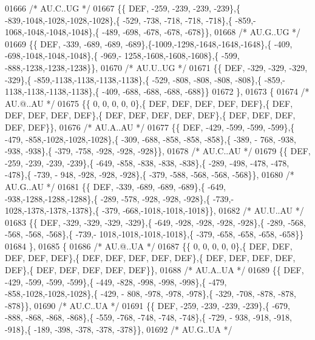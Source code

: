 \begin{DoxyCode}
01666 \textcolor{comment}{/* AU.C..UG */}
01667 \{\{  DEF, -259, -239, -239, -239\},\{ -839,-1048,-1028,-1028,-1028\},\{ -529, -738, -718, -718, -718\},\{ -859,-
      1068,-1048,-1048,-1048\},\{ -489, -698, -678, -678, -678\}\},
01668 \textcolor{comment}{/* AU.G..UG */}
01669 \{\{  DEF, -339, -689, -689, -689\},\{-1009,-1298,-1648,-1648,-1648\},\{ -409, -698,-1048,-1048,-1048\},\{ -969,-
      1258,-1608,-1608,-1608\},\{ -599, -888,-1238,-1238,-1238\}\},
01670 \textcolor{comment}{/* AU.U..UG */}
01671 \{\{  DEF, -329, -329, -329, -329\},\{ -859,-1138,-1138,-1138,-1138\},\{ -529, -808, -808, -808, -808\},\{ -859,-
      1138,-1138,-1138,-1138\},\{ -409, -688, -688, -688, -688\}\}
01672 \},
01673 \{
01674 \textcolor{comment}{/* AU.@..AU */}
01675 \{\{    0,    0,    0,    0,    0\},\{  DEF,  DEF,  DEF,  DEF,  DEF\},\{  DEF,  DEF,  DEF,  DEF,  DEF\},\{  DEF,  
      DEF,  DEF,  DEF,  DEF\},\{  DEF,  DEF,  DEF,  DEF,  DEF\}\},
01676 \textcolor{comment}{/* AU.A..AU */}
01677 \{\{  DEF, -429, -599, -599, -599\},\{ -479, -858,-1028,-1028,-1028\},\{ -309, -688, -858, -858, -858\},\{ -389, -
      768, -938, -938, -938\},\{ -379, -758, -928, -928, -928\}\},
01678 \textcolor{comment}{/* AU.C..AU */}
01679 \{\{  DEF, -259, -239, -239, -239\},\{ -649, -858, -838, -838, -838\},\{ -289, -498, -478, -478, -478\},\{ -739, -
      948, -928, -928, -928\},\{ -379, -588, -568, -568, -568\}\},
01680 \textcolor{comment}{/* AU.G..AU */}
01681 \{\{  DEF, -339, -689, -689, -689\},\{ -649, -938,-1288,-1288,-1288\},\{ -289, -578, -928, -928, -928\},\{ -739,-
      1028,-1378,-1378,-1378\},\{ -379, -668,-1018,-1018,-1018\}\},
01682 \textcolor{comment}{/* AU.U..AU */}
01683 \{\{  DEF, -329, -329, -329, -329\},\{ -649, -928, -928, -928, -928\},\{ -289, -568, -568, -568, -568\},\{ -739,-
      1018,-1018,-1018,-1018\},\{ -379, -658, -658, -658, -658\}\}
01684 \},
01685 \{
01686 \textcolor{comment}{/* AU.@..UA */}
01687 \{\{    0,    0,    0,    0,    0\},\{  DEF,  DEF,  DEF,  DEF,  DEF\},\{  DEF,  DEF,  DEF,  DEF,  DEF\},\{  DEF,  
      DEF,  DEF,  DEF,  DEF\},\{  DEF,  DEF,  DEF,  DEF,  DEF\}\},
01688 \textcolor{comment}{/* AU.A..UA */}
01689 \{\{  DEF, -429, -599, -599, -599\},\{ -449, -828, -998, -998, -998\},\{ -479, -858,-1028,-1028,-1028\},\{ -429, -
      808, -978, -978, -978\},\{ -329, -708, -878, -878, -878\}\},
01690 \textcolor{comment}{/* AU.C..UA */}
01691 \{\{  DEF, -259, -239, -239, -239\},\{ -679, -888, -868, -868, -868\},\{ -559, -768, -748, -748, -748\},\{ -729, -
      938, -918, -918, -918\},\{ -189, -398, -378, -378, -378\}\},
01692 \textcolor{comment}{/* AU.G..UA */}

\end{DoxyCode}
